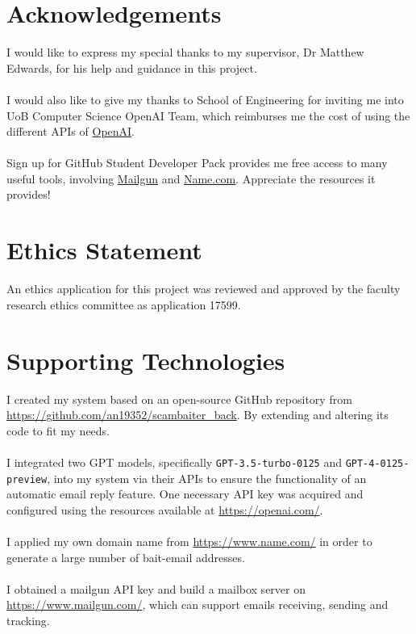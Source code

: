 \documentclass[ oneside,%
                    author={Cassie Qing Tang},
                    degree={BSc},
                     title={An Automated Response System for Disrupting Online Pet Scamming \\ },
                    subtitle={ }]{dissertation}
\begin{document}
\chapter*{Acknowledgements}
I would like to express my special thanks to my supervisor, Dr Matthew Edwards, for his help and guidance in this project.
\\
\\
I would also like to give my thanks to School of Engineering for inviting me into UoB Computer Science OpenAI Team, which reimburses me the cost of using the different APIs of \href{https://openai.com/}{OpenAI}.
\\
\\
Sign up for GitHub Student Developer Pack provides me free access to many useful tools, involving \href{https://www.mailgun.com}{Mailgun} and \href{https://www.name.com}{Name.com}. Appreciate the resources it provides!

\makedecl


\tableofcontents
\listoffigures
\listoftables

\chapter*{Ethics Statement}
An ethics application for this project was reviewed and approved by the faculty research ethics committee as application 17599.


\chapter*{Supporting Technologies}
I created my system based on an open-source GitHub repository from \url{https://github.com/an19352/scambaiter_back}. By extending and altering its code to fit my needs.
\\
\\
I integrated two GPT models, specifically \texttt{GPT-3.5-turbo-0125} and \texttt{GPT-4-0125-preview}, into my system via their APIs to ensure the functionality of an automatic email reply feature. One necessary API key was acquired and configured using the resources available at \url{https://openai.com/}.
\\
\\
I applied my own domain name from \url{https://www.name.com/} in order to generate a large number of bait-email addresses.
\\
\\
I obtained a mailgun API key and build a mailbox server on \url{https://www.mailgun.com/}, which can support emails receiving, sending and tracking.
\end{document}
